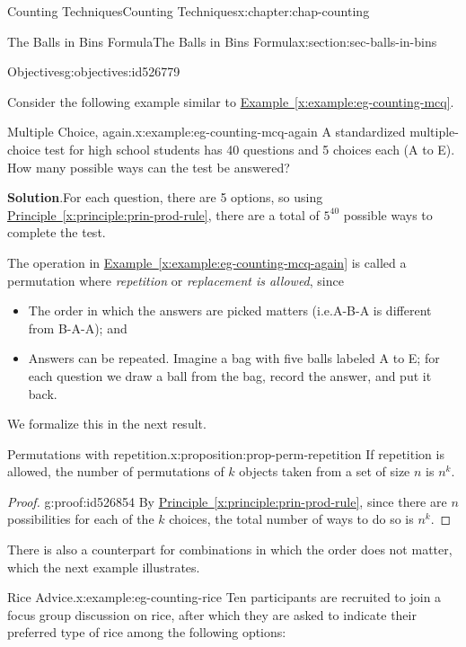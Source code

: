 \documentclass[oneside,10pt,]{book}
\newcommand{\blocktitlefont}{\relax}
\newcommand{\xreffont}{\relax}
\numberwithin{equation}{section}
\begin{document}
\begin{chapterptx}{Counting Techniques}{}{Counting Techniques}{}{}{x:chapter:chap-counting}
\begin{sectionptx}{The Balls in Bins Formula}{}{The Balls in Bins Formula}{}{}{x:section:sec-balls-in-bins}
\begin{objectives}{Objectives}{g:objectives:id526779}
\begin{itemize}[label=\textbullet]
\end{itemize}
\end{objectives}
Consider the following example similar to \hyperref[x:example:eg-counting-mcq]{Example~{\xreffont\ref{x:example:eg-counting-mcq}}}.%
\begin{example}{Multiple Choice, again.}{x:example:eg-counting-mcq-again}%
A standardized multiple-choice test for high school students has 40 questions and 5 choices each (A to E). How many possible ways can the test be answered?%
\par\smallskip%
\noindent\textbf{\blocktitlefont Solution}.\hypertarget{g:solution:id526753}{}\quad{}For each question, there are 5 options, so using \hyperref[x:principle:prin-prod-rule]{Principle~{\xreffont\ref{x:principle:prin-prod-rule}}}, there are a total of \(5^{40}\) possible ways to complete the test.%
\end{example}
The operation in \hyperref[x:example:eg-counting-mcq-again]{Example~{\xreffont\ref{x:example:eg-counting-mcq-again}}} is called a permutation where \emph{repetition} or \emph{replacement is allowed}, since%
\begin{itemize}[label=\textbullet]
\item{}The order in which the answers are picked matters (i.e.\@ A-B-A is different from B-A-A); and%
\item{}Answers can be repeated. Imagine a bag with five balls labeled A to E; for each question we draw a ball from the bag, record the answer, and put it back.%
\end{itemize}
We formalize this in the next result.%
\begin{proposition}{Permutations with repetition.}{}{x:proposition:prop-perm-repetition}%
If repetition is allowed, the number of permutations of \(k\) objects taken from a set of size \(n\) is \(n^k\).%
\end{proposition}
\begin{proof}{}{g:proof:id526854}
By \hyperref[x:principle:prin-prod-rule]{Principle~{\xreffont\ref{x:principle:prin-prod-rule}}}, since there are \(n\) possibilities for each of the \(k\) choices, the total number of ways to do so is \(n^k\).%
\end{proof}
There is also a counterpart for combinations in which the order does not matter, which the next example illustrates.%
\begin{example}{Rice Advice.}{x:example:eg-counting-rice}%
Ten participants are recruited to join a focus group discussion on rice, after which they are asked to indicate their preferred type of rice among the following options:%

\end{example}
\end{sectionptx}
\end{chapterptx}
\end{document}
